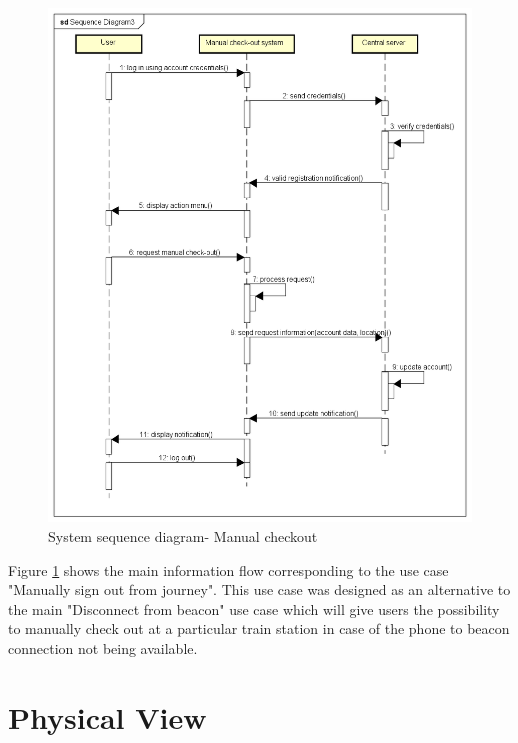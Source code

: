 \begin{figure}[H]
	\centering
	\includegraphics[width=\textwidth]{Pictures/seq_diagram_manualCheckOut.png}
	\caption{System sequence diagram- Manual checkout}
	\label{fig:seqDiagram4}
\end{figure}
Figure \ref{fig:seqDiagram4} shows the main information flow corresponding to the use case "Manually sign out from journey". This use case was designed as an alternative to the main "Disconnect from beacon" use case which will give users the possibility to manually check out at a particular train station in case of the phone to beacon connection not being available.

\section{Physical View}